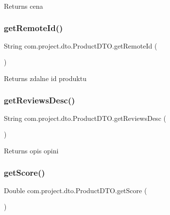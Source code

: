\begin{DoxyReturn}{Returns}
cena 
\end{DoxyReturn}
\mbox{\label{classcom_1_1project_1_1dto_1_1_product_d_t_o_a378c6cbbca6e335bf6220dfb9554696b}} 
\subsubsection{get\+Remote\+Id()}
{\footnotesize\ttfamily String com.\+project.\+dto.\+Product\+D\+T\+O.\+get\+Remote\+Id (\begin{DoxyParamCaption}{ }\end{DoxyParamCaption})}

\begin{DoxyReturn}{Returns}
zdalne id produktu 
\end{DoxyReturn}
\mbox{\label{classcom_1_1project_1_1dto_1_1_product_d_t_o_a933d655934ceb8340c7e1671a57f2774}} 
\subsubsection{get\+Reviews\+Desc()}
{\footnotesize\ttfamily String com.\+project.\+dto.\+Product\+D\+T\+O.\+get\+Reviews\+Desc (\begin{DoxyParamCaption}{ }\end{DoxyParamCaption})}

\begin{DoxyReturn}{Returns}
opis opini 
\end{DoxyReturn}
\mbox{\label{classcom_1_1project_1_1dto_1_1_product_d_t_o_acab206bddf31bc2ac61593658df21a80}} 
\subsubsection{get\+Score()}
{\footnotesize\ttfamily Double com.\+project.\+dto.\+Product\+D\+T\+O.\+get\+Score (\begin{DoxyParamCaption}{ }\end{DoxyParamCaption})}

